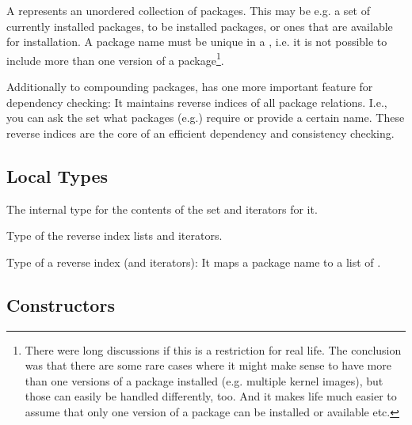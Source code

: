 \documentclass[10pt]{article}
\begin{document}


A  represents an unordered collection of packages. This
may be e.g. a set of currently installed packages, to be installed
packages, or ones that are available for installation. A package name
must be unique in a , i.e. it is not possible to include
more than one version of a package\footnote{
  There were long discussions if this is a restriction for real life.
  The conclusion was that there are some rare cases where it might
  make sense to have more than one versions of a package installed
  (e.g. multiple kernel images), but those can easily be handled
  differently, too. And it makes life much easier to assume that only
  one version of a package can be installed or available etc.}.

Additionally to compounding packages,  has one more
important feature for dependency checking: It maintains reverse
indices of all package relations. I.e., you can ask the set what
packages (e.g.) require or provide a certain name. These reverse
indices are the core of an efficient dependency and consistency
checking.


\subsection{Local Types}

The internal type for the contents of the set and iterators for it.

Type of the reverse index lists and iterators.

Type of a reverse index (and iterators): It maps a package name to a
list of .

\subsection{Constructors}
\end{document}
